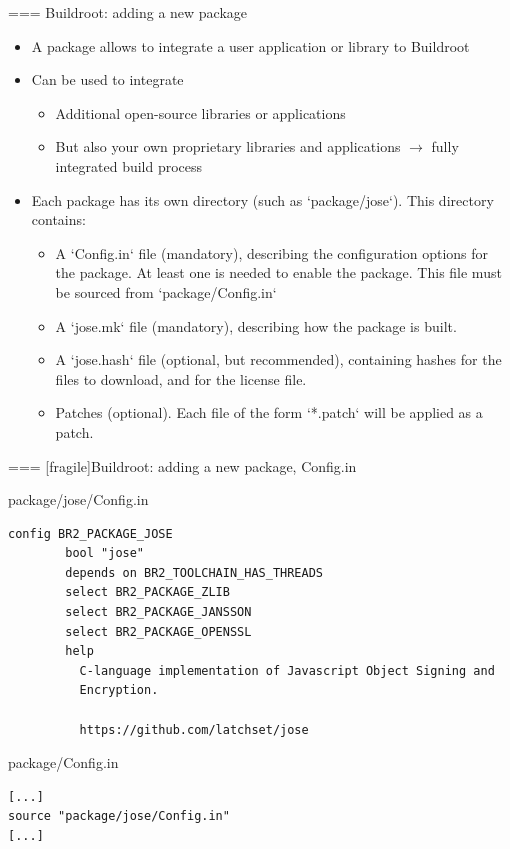 === {Buildroot: adding a new package}
  \begin{itemize}
  \item A package allows to integrate a user application or library to
    Buildroot
  \item Can be used to integrate
    \begin{itemize}
    \item Additional open-source libraries or applications
    \item But also your own proprietary libraries and applications
      $\rightarrow$ fully integrated build process
    \end{itemize}
  \item Each package has its own directory (such as
    `package/jose`). This directory contains:
    \begin{itemize}
    \item A `Config.in` file (mandatory), describing the
      configuration options for the package. At least one is needed to
      enable the package. This file must be sourced from
      `package/Config.in`
    \item A `jose.mk` file (mandatory), describing how the
      package is built.
    \item A `jose.hash` file (optional, but recommended), containing
      hashes for the files to download, and for the license file.
    \item Patches (optional). Each file of the form
      `*.patch` will be applied as a patch.
    \end{itemize}
  \end{itemize}


=== [fragile]{Buildroot: adding a new package, Config.in}
  \begin{block}{package/jose/Config.in}
    {\scriptsize
\begin{verbatim}
config BR2_PACKAGE_JOSE
        bool "jose"
        depends on BR2_TOOLCHAIN_HAS_THREADS
        select BR2_PACKAGE_ZLIB
        select BR2_PACKAGE_JANSSON
        select BR2_PACKAGE_OPENSSL
        help
          C-language implementation of Javascript Object Signing and
          Encryption.

          https://github.com/latchset/jose
\end{verbatim}
      }
    \end{block}

    \begin{block}{package/Config.in}
    {\scriptsize
\begin{verbatim}
[...]
source "package/jose/Config.in"
[...]
\end{verbatim}
    }
    \end{block}


